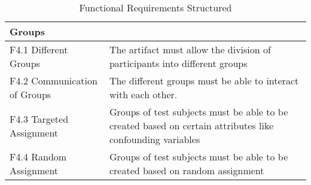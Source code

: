 \begin{table}
\begin{tabular}{L{0.35\textwidth}L{0.59\textwidth}}
    Groups                      &             \\ \hline
    F4.1 Different Groups           & The artifact must allow the division of participants into different groups            \\
    F4.2 Communication of Groups    & The different groups must be able to interact with each other.            \\ 
    F4.3 Targeted Assignment        & Groups of test subjects must be able to be created based on certain attributes like confounding variables \\
    F4.4 Random Assignment          & Groups of test subjects must be able to be created based on random assignment \\ \hline
    \end{tabular}
    \caption[Functional Requirements Structured]{Functional Requirements Structured}\label{tab:FuncRequirementsCat}
    \end{table}


